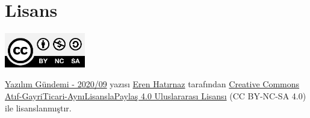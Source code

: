 \documentclass[11pt]{article}
\begin{document}
\section{Lisans}
\label{sec:org32cebbd}
\begin{center}
\begin{center}
\includegraphics[height=1.5cm]{../../../img/CC_BY-NC-SA_4.0.png}
\end{center}

\href{yazilim-gundemi-2020-09.pdf}{Yazılım Gündemi - 2020/09} yazısı \href{https://erenhatirnaz.github.io}{Eren Hatırnaz} tarafından \href{http://creativecommons.org/licenses/by-nc-sa/4.0/}{Creative Commons
Atıf-GayriTicari-AynıLisanslaPaylaş 4.0 Uluslararası Lisansı} (CC BY-NC-SA 4.0)
ile lisanslanmıştır.
\end{center}
\end{document}
